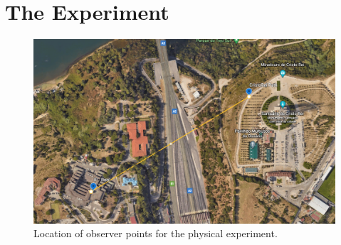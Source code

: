 \section{The Experiment}%
\label{sec:the_experiment}

\begin{figure}[htpb]
    \centering
    \includegraphics[width=0.8\linewidth]{img/png/experimentMap.png}
    \caption{Location of observer points for the physical experiment.}
    \label{fig:experiment_map}
\end{figure}
